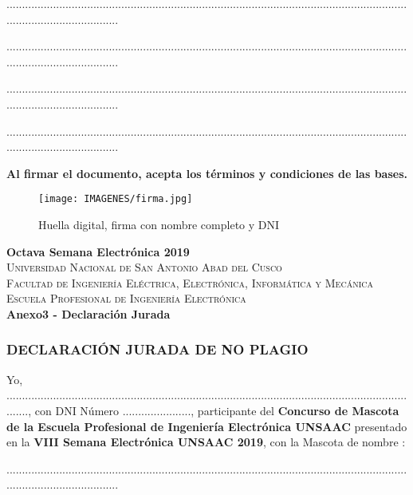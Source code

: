 \documentclass{article}
\begin{document}
.....................................................................................................................................................................

.....................................................................................................................................................................

.....................................................................................................................................................................

.....................................................................................................................................................................


\textbf{Al firmar el documento, acepta los términos y condiciones de las bases.}

\begin{figure}[hbtp]
\centering
\texttt{[image: IMAGENES/firma.jpg]}
\caption{Huella digital, firma con nombre completo y DNI}
\end{figure}

\newpage
{\center
{\Huge \bfseries Octava Semana Electrónica 2019} \\ [0.4cm]
\textsc{\LARGE  Universidad Nacional de San Antonio Abad del Cusco}\\[0.4cm] 
\textsc{\Large Facultad de Ingeniería Eléctrica, Electrónica, Informática y Mecánica}\\[0.4cm] 
\textsc{\large Escuela Profesional de Ingeniería Electrónica}\\[0.4cm]
{ \bfseries Anexo3 - Declaración Jurada}}

\subsubsection{DECLARACIÓN JURADA DE NO PLAGIO}

Yo, ........................................................................................................................................, con DNI Número 
......................, participante del \textbf{Concurso de Mascota de la Escuela Profesional de Ingeniería Electrónica UNSAAC} presentado en la \textbf{VIII Semana Electrónica UNSAAC 2019}, con la Mascota de nombre :

.....................................................................................................................................................................
\end{document}
